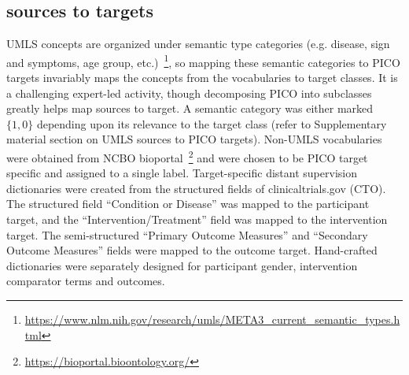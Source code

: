 \documentclass[10.7pt,]{article}
\begin{document}
\subsection{sources to targets}\label{s2t}
%
UMLS concepts are organized under semantic type categories (e.g. disease, sign and symptoms, age group, etc.)~\footnote{\url{https://www.nlm.nih.gov/research/umls/META3_current_semantic_types.html}}, so mapping these semantic categories to PICO targets invariably maps the concepts from the vocabularies to target classes.
It is a challenging expert-led activity, though decomposing PICO into subclasses greatly helps map sources to target.
A semantic category was either marked $\{1, 0\}$ depending upon its relevance to the target class (refer to Supplementary material section on UMLS sources to PICO targets).
Non-UMLS vocabularies were obtained from NCBO bioportal~\footnote{\url{https://bioportal.bioontology.org/}} and were chosen to be PICO target specific and assigned to a single label.
Target-specific distant supervision dictionaries were created from the structured fields of clinicaltrials.gov (CTO). 
The structured field ``Condition or Disease'' was mapped to the participant target, and the ``Intervention/Treatment'' field was mapped to the intervention target.
The semi-structured ``Primary Outcome Measures'' and ``Secondary Outcome Measures'' fields were mapped to the outcome target.
Hand-crafted dictionaries were separately designed for participant gender, intervention comparator terms and outcomes.
%
%
%
\end{document}
